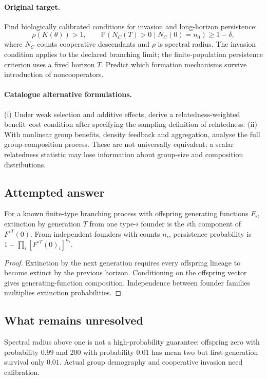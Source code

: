 \documentclass[11pt]{article}
\begin{document}
\paragraph{Original target.}
Find biologically calibrated conditions for invasion and long-horizon persistence:
\[
\rho(K(\theta))>1,
\qquad
\mathbb{P}(N_C(T)>0\mid N_C(0)=n_0)\geq1-\delta,
\]
where $N_C$ counts cooperative descendants and $\rho$ is spectral radius. The invasion condition applies to the declared branching limit; the finite-population persistence criterion uses a fixed horizon $T$. Predict which formation mechanisms survive introduction of noncooperators.
\paragraph{Catalogue alternative formulations.}
(i) Under weak selection and additive effects, derive a relatedness-weighted benefit--cost condition after specifying the sampling definition of relatedness. (ii) With nonlinear group benefits, density feedback and aggregation, analyse the full group-composition process. These are not universally equivalent; a scalar relatedness statistic may lose information about group-size and composition distributions.
\subsection{Attempted answer}
\begin{proposition}
For a known finite-type branching process with offspring generating functions $F_i$, extinction by generation $T$ from one type-$i$ founder is the $i$th component of $F^{\circ T}(0)$. From independent founders with counts $n_i$, persistence probability is $1-\prod_i[F^{\circ T}(0)_i]^{n_i}$.
\end{proposition}
\begin{proof}
Extinction by the next generation requires every offspring lineage to become extinct by the previous horizon. Conditioning on the offspring vector gives generating-function composition. Independence between founder families multiplies extinction probabilities.
\end{proof}
\subsection{What remains unresolved}
Spectral radius above one is not a high-probability guarantee: offspring zero with probability $0.99$ and 200 with probability $0.01$ has mean two but first-generation survival only $0.01$. Actual group demography and cooperative invasion need calibration.
\end{document}
